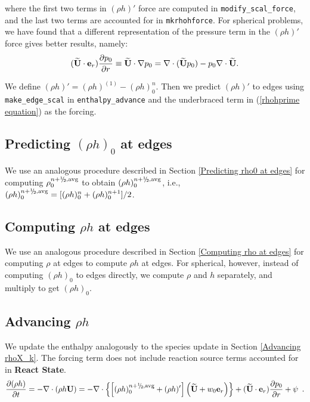 where the first two terms in $(\rho h)'$ force are computed in 
{\tt modify\_scal\_force}, and the last two terms are accounted for in
{\tt mkrhohforce}.  For spherical problems, we have found that a different 
representation of the pressure term in the $(\rho h)'$ force gives better
results, namely:
\begin{equation}
(\widetilde{{\bf U}} \cdot \mathbf{e}_r)\frac{\partial p_0}{\partial r} \equiv \widetilde{{\bf U}}\cdot\nabla p_0 = 
\nabla\cdot(\widetilde{{\bf U}} p_0) - p_0\nabla\cdot\widetilde{{\bf U}}.
\end{equation}


We define $(\rho h)' = (\rho h)^{(1)} - (\rho h)_0^n$.  Then we predict 
$(\rho h)'$ to edges using {\tt make\_edge\_scal} in {\tt enthalpy\_advance} 
and the underbraced term in (\ref{rhohprime equation}) as the forcing.

\subsection{Predicting $(\rho h)_0$ at edges}
We use an analogous procedure described in Section \ref{Predicting
rho0 at edges} for computing $\rho_0^{n+\myhalf,\rm{avg}}$ to obtain 
$(\rho h)_0^{n+\myhalf,\rm{avg}}$, i.e., 
$(\rho h)_0^{n+\myhalf,{\rm avg}} = [(\rho h)_0^{n} + (\rho h)_0^{n+1}]/2$.

\subsection{Computing $\rho h$ at edges}
We use an analogous procedure described in Section \ref{Computing rho
  at edges} for computing $\rho$ at edges to compute $\rho h$ at
edges.  For spherical, however, instead of computing $(\rho h)_0$ to
edges directly, we compute $\rho$ and $h$ separately, and multiply to
get $(\rho h)_0$.

\subsection{Advancing $\rho h$}
We update the enthalpy analogously to the species update in 
Section \ref{Advancing rhoX_k}.  The forcing term does not include reaction
source terms accounted for in {\bf React State}.
\begin{equation}
\frac{\partial(\rho h)}{\partial t} = -\nabla\cdot(\rho h\Ub) = 
-\nabla\cdot\left\{\left[(\rho h)_0^{n+\myhalf,{\rm avg}} 
+ (\rho h)'\right]\left(\Ubt + w_0\eb_r\right)\right\} + (\Ubt \cdot \er)\frac{\partial p_0}{\partial r} + \psi  \enskip .
\end{equation}




